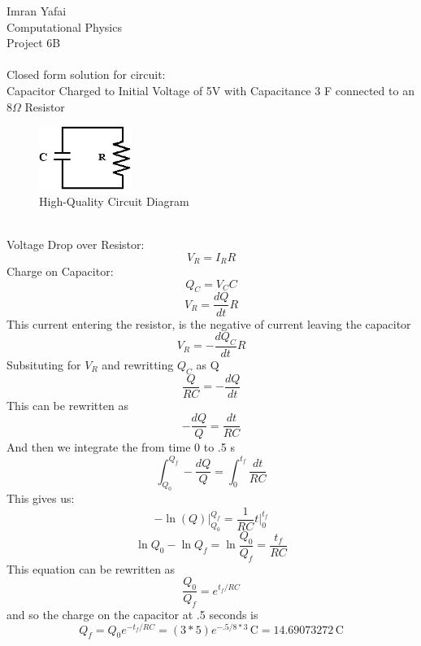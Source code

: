 \documentclass{article}
\begin{document}
Imran Yafai\\
Computational Physics\\
Project 6B\\
\\
Closed form solution for circuit:\\
Capacitor Charged to Initial Voltage of 5V with Capacitance 3 F connected to an 8$\Omega$ Resistor
\begin{figure}[ht!]
\centering
\includegraphics[width=30mm]{circuit.jpg}
\caption{High-Quality Circuit Diagram}
\label{overflow}
\end{figure}\\
Voltage Drop over Resistor:
\[V_R=I_RR\]
Charge on Capacitor:\\
\[Q_C=V_CC\]
\[V_R=\frac{dQ}{dt}R\]
This current entering the resistor, is the negative of current leaving the capacitor\\
\[V_R=-\frac{dQ_C}{dt}R\]
Subsituting for $V_R$ and rewritting $Q_C$ as Q
\[\frac{Q}{RC}=-\frac{dQ}{dt}\]
This can be rewritten as
\[-\frac{dQ}{Q}=\frac{dt}{RC}\]
And then we integrate the from time 0 to .5 s
\[\int_{Q_0}^{Q_f} -\frac{dQ}{Q}=\int_0^{t_f}\frac{dt}{RC}\]
This gives us:
\[-\ln(Q)\bigg|_{Q_0}^{Q_f}=\frac{1}{RC}t\bigg|_0^{t_f}\]
\[\ln{Q_0}-\ln{Q_f}=\ln{\frac{Q_0}{Q_f}}=\frac{t_f}{RC}\]
This equation can be rewritten as
\[\frac{Q_0}{Q_f}=e^{t_f/RC}\]
and so the charge on the capacitor at .5 seconds is
\[Q_f=Q_0e^{-t_f/RC}=(3*5)e^{-.5/8*3} \mathrm{\,C}= \mathrm{14.69073272 \,C}\]
\end{document}
